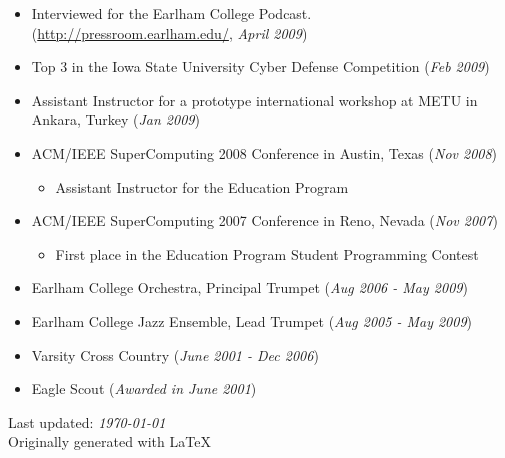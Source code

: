 \documentclass[10pt]{article}
\begin{document}
\begin{itemize}
	\item \indent Interviewed for the Earlham College Podcast. (\url{http://pressroom.earlham.edu/}, \emph{April 2009})
  \item \indent Top 3 in the Iowa State University Cyber Defense Competition (\emph{Feb 2009})
  \item \indent Assistant Instructor for a prototype international workshop at METU in Ankara, Turkey (\emph{Jan 2009})
  \item \indent ACM/IEEE SuperComputing 2008 Conference in Austin, Texas (\emph{Nov 2008})
		\vspace{-2mm}
		\begin{itemize}
			\item \indent Assistant Instructor for the Education Program
		\end{itemize}
		\vspace{-1mm}
  \item \indent ACM/IEEE SuperComputing 2007 Conference in Reno, Nevada (\emph{Nov 2007})
		\vspace{-2mm}
		\begin{itemize}
			\item \indent First place in the Education Program Student Programming Contest
		\end{itemize}
		\vspace{-1mm}
  \item \indent Earlham College Orchestra, Principal Trumpet (\emph{Aug 2006 - May 2009})
  \item \indent Earlham College Jazz Ensemble, Lead Trumpet (\emph{Aug 2005 - May 2009})
  \item \indent Varsity Cross Country (\emph{June 2001 - Dec 2006})
  \item \indent Eagle Scout (\emph{Awarded in June 2001})
\end{itemize}
\vfill
\begin{flushright}
Last updated: \emph{\today}
~\\
Originally generated with \LaTeX
\end{flushright}
\end{document}
